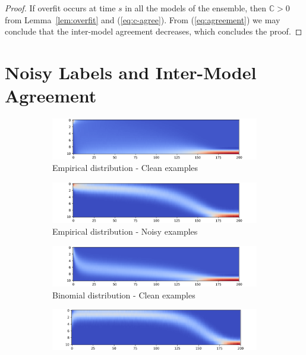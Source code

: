 \documentclass{article}
\newcommand{\Cr}{\mathbb{C}}
\begin{document}
\begin{proof}
If overfit occurs at time $s$ in all the models of the ensemble, then $\Cr>0$ from Lemma~\ref{lem:overfit} and (\ref{eq:c-agree}). From (\ref{eq:agreement}) we may conclude that the inter-model agreement decreases, which concludes the proof.

\end{proof}

\section{Noisy Labels and Inter-Model Agreement}
\label{app:noisy-IB}

\begin{figure}[htb]
\centering
\begin{subfigure}[tb]{0.49\textwidth}
    \includegraphics[width=\linewidth]{figs/hoeC.png}
  \centering
  \caption{Empirical distribution - Clean examples}
\end{subfigure}
\begin{subfigure}[tb]{0.49\textwidth}
    \includegraphics[width=\linewidth]{figs/hoeCBIN.png}
  \centering
  \caption{Empirical distribution - Noisy examples}
\end{subfigure}
\begin{subfigure}[tb]{0.49\textwidth}
    \includegraphics[width=\linewidth]{figs/hoeN.png}
  \centering
  \caption{Binomial distribution - Clean examples}
\end{subfigure}
\begin{subfigure}[tb]{0.49\textwidth}
    \includegraphics[width=\linewidth]{figs/hoeNBIN.png}

\end{subfigure}
\end{figure}
\end{document}
